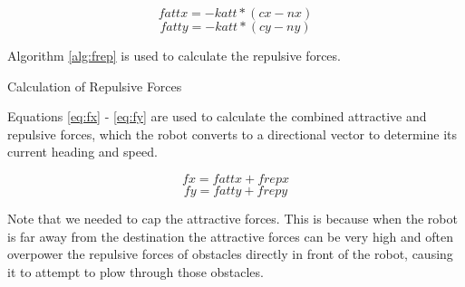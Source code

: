 \documentclass[11pt]{article}
\begin{document}
\begin{equation}
fattx = -katt * (cx - nx)
\label{eq:fattx}
\end{equation} 
\begin{equation}
fatty = -katt * (cy - ny)
\label{eq:fatty}
\end{equation} 


Algorithm \ref{alg:frep} is used to calculate the repulsive forces.

\begin{algorithm}[H]
\caption{Calculation of Repulsive Forces}
\label{alg:frep}
\begin{algorithmic}[1]

	\ENDIF
\ENDFOR

\end{algorithmic}
\end{algorithm}


Equations \ref{eq:fx} - \ref{eq:fy} are used to calculate the combined attractive and repulsive forces, which the robot converts to a directional vector to determine its current heading and speed.

\begin{equation}
fx = fattx + frepx
\label{eq:fx}
\end{equation} 
\begin{equation}
fy = fatty + frepy
\label{eq:fy}
\end{equation} 

Note that we needed to cap the attractive forces. This is because when the robot is far away from the destination the attractive forces can be very high and often overpower the repulsive forces of obstacles directly in front of the robot, causing it to attempt to plow through those obstacles.
\end{document}
